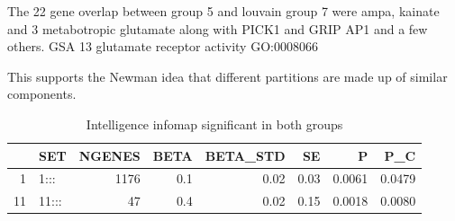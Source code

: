 The 22 gene overlap between group 5 and louvain group 7 were ampa, kainate and 3 metabotropic glutamate along with PICK1 and GRIP AP1 and a few others. GSA 13 glutamate receptor activity GO:0008066 

This supports the Newman idea that different partitions are made up of similar components. 





\begin{table}[ht]
\centering
\begin{tabular}{rlrrrrrr}
  \hline
 & SET & NGENES & BETA & BETA\_STD & SE & P & P\_C \\ 
  \hline
1 & 1::: & 1176 & 0.1 & 0.02 & 0.03 & 0.0061 & 0.0479 \\ 
  11 & 11::: & 47 & 0.4 & 0.02 & 0.15 & 0.0018 & 0.0080 \\ 
   \hline
\end{tabular}
\caption{Intelligence infomap significant in both groups}
\label{tab:Infomap Intelligence infomap significant in both groups}
\end{table}

